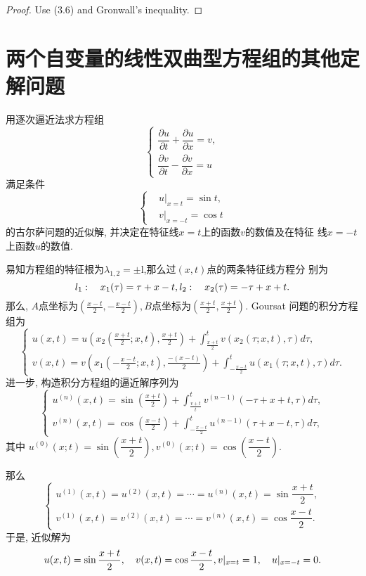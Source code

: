 \begin{proof}
  Use (3.6) and Gronwall's inequality.
\end{proof}


\section{两个自变量的线性双曲型方程组的其他定解问题}


\begin{exercise}
	用逐次逼近法求方程组
	$$\begin{cases}
		\dfrac{\partial u}{\partial t}+\dfrac{\partial u}{\partial x}=v,\\
		\dfrac{\partial v}{\partial t}-\dfrac{\partial v}{\partial x}=u
	\end{cases}$$
	满足条件
	$$\begin{cases}
		&u|_{x=t}=\sin t,\\
		&v|_{x=-t}=\cos t
	\end{cases}$$
	的古尔萨问题的近似解, 并决定在特征线$x=t$上的函数$v$的数值及在特征
	线$x=-t$上函数$u$的数值.
\end{exercise}

\begin{solve}
	易知方程组的特征根为$\lambda_{1,2}=\pm$l,那么过$(x,t)$点的两条特征线方程分
	别为
	$$l_{1}:\quad x_{1}(\tau)=\tau+x-t,\\l_{2}:\quad x_{2}(\tau)=-\tau+x+t.$$
	那么, $A$点坐标为$\left(\frac{x-t}2,-\frac{x-t}2\right),B$点坐标为$\left(\frac {x+t}2,\frac{x+t}2\right)$. Goursat 问题的积分方程组为
	$$\begin{cases}
		\displaystyle u(x,t)=u\left(x_{2}\left(\frac{x+t}{2};x,t\right),\frac{x+t}{2}\right)+\int_{\frac{x+t}{2}}^{t}v(x_{2}(\tau;x,t),\tau)d\tau,\\
		\displaystyle v(x,t)=v\left(x_{1}\left(-\frac{x-t}{2};x,t\right),\frac{-(x-t)}{2}\right)+\int_{-\frac{x-t}{2}}^{t}u(x_{1}(\tau;x,t),\tau)d\tau.
	\end{cases}$$
	进一步, 构造积分方程组的逼近解序列为
	$$\begin{cases}
		u^{(n)}(x,t)=\sin\left(\frac{x+t}{2}\right)+\int_{\frac{v+t}{t}}^{t}v^{(n-1)}(-\tau+x+t,\tau)d\tau,\\
		v^{(n)}(x,t)=\cos\left(\frac{x-t}{2}\right)+\int_{-\frac{x-t}{2}}^{t}u^{(n-1)}(\tau+x-t,\tau)d\tau,
	\end{cases}$$
	其中 $u^{(0)}(x;t)=\sin\left(\dfrac{x+t}2\right),v^{(0)}(x;t)=\cos\left(\dfrac{x-t}2\right)$.
	
	那么
	$$\begin{cases}
		u^{(1)}(x,t)=u^{(2)}(x,t)=\cdots=u^{(n)}(x,t)=\sin\dfrac{x+t}{2},\\
		v^{(1)}(x,t)=v^{(2)}(x,t)=\cdots=v^{(n)}(x,t)=\cos\dfrac{x-t}{2}.
	\end{cases}$$
	于是, 近似解为
	\[u(x,t)=\sin\frac{x+t}{2},\quad v(x,t)=\cos\frac{x-t}{2},\\v|_{x=t}=1,\quad u|_{x=-t}=0.\qedhere\]
\end{solve}


